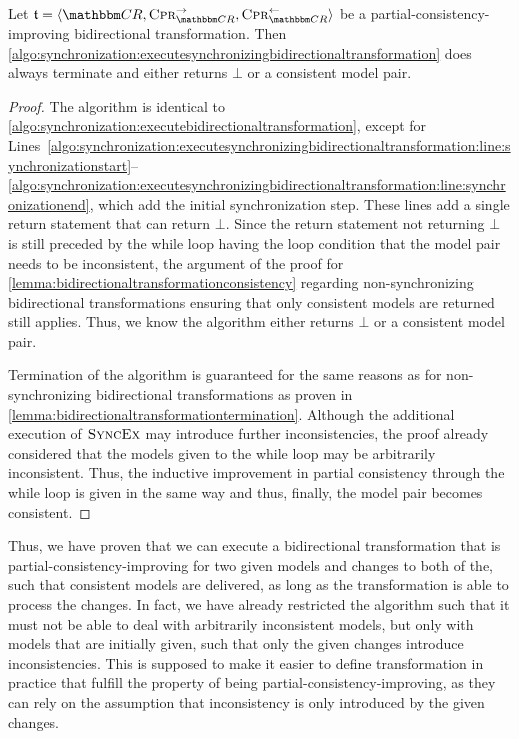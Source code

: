 \begin{theorem}
    \label{theorem:synchronizingbidirectionaltransformationconsistencytermination}
    Let $\transformation{t} = \tupled{\consistencyrelationset{CR}, \consistencypreservationrule{\consistencyrelationset{CR}}^{\rightarrow}, \consistencypreservationrule{\consistencyrelationset{CR}}^{\leftarrow}}$ be a partial-consistency-improving bidirectional transformation.
    Then \autoref{algo:synchronization:executesynchronizingbidirectionaltransformation} does always terminate and either returns $\bot$ or a consistent model pair.
\end{theorem}
\begin{proof}
    The algorithm is identical to \autoref{algo:synchronization:executebidirectionaltransformation}, except for Lines~\ref{algo:synchronization:executesynchronizingbidirectionaltransformation:line:synchronizationstart}--\ref{algo:synchronization:executesynchronizingbidirectionaltransformation:line:synchronizationend}, which add the initial synchronization step.
    These lines add a single return statement that can return $\bot$.
    Since the return statement not returning $\bot$ is still preceded by the while loop having the loop condition that the model pair needs to be inconsistent, the argument of the proof for \autoref{lemma:bidirectionaltransformationconsistency} regarding non-synchronizing bidirectional transformations ensuring that only consistent models are returned still applies.
    Thus, we know the algorithm either returns $\bot$ or a consistent model pair.

    Termination of the algorithm is guaranteed for the same reasons as for non-synchronizing bidirectional transformations as proven in \autoref{lemma:bidirectionaltransformationtermination}.
    Although the additional execution of $\textsc{SyncEx}$ may introduce further inconsistencies, the proof already considered that the models given to the while loop may be arbitrarily inconsistent.
    Thus, the inductive improvement in partial consistency through the while loop is given in the same way and thus, finally, the model pair becomes consistent.
\end{proof}

Thus, we have proven that we can execute a bidirectional transformation that is partial-consistency-improving for two given models and changes to both of the, such that consistent models are delivered, as long as the transformation is able to process the changes.
In fact, we have already restricted the algorithm such that it must not be able to deal with arbitrarily inconsistent models, but only with models that are initially given, such that only the given changes introduce inconsistencies.
This is supposed to make it easier to define transformation in practice that fulfill the property of being partial-consistency-improving, as they can rely on the assumption that inconsistency is only introduced by the given changes.

